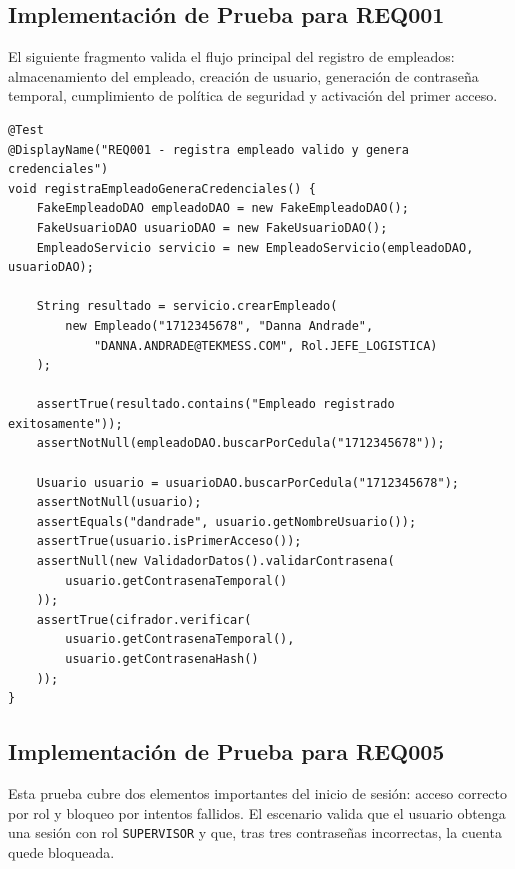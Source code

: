 \documentclass[12pt,a4paper]{article}
\begin{document}
\subsection{Implementación de Prueba para REQ001}

El siguiente fragmento valida el flujo principal del registro de empleados: almacenamiento del empleado, creación de usuario, generación de contraseña temporal, cumplimiento de política de seguridad y activación del primer acceso.

\begin{lstlisting}[style=javaStyle, caption={Prueba de registro de empleado y generación de credenciales}]
@Test
@DisplayName("REQ001 - registra empleado valido y genera credenciales")
void registraEmpleadoGeneraCredenciales() {
    FakeEmpleadoDAO empleadoDAO = new FakeEmpleadoDAO();
    FakeUsuarioDAO usuarioDAO = new FakeUsuarioDAO();
    EmpleadoServicio servicio = new EmpleadoServicio(empleadoDAO, usuarioDAO);

    String resultado = servicio.crearEmpleado(
        new Empleado("1712345678", "Danna Andrade",
            "DANNA.ANDRADE@TEKMESS.COM", Rol.JEFE_LOGISTICA)
    );

    assertTrue(resultado.contains("Empleado registrado exitosamente"));
    assertNotNull(empleadoDAO.buscarPorCedula("1712345678"));

    Usuario usuario = usuarioDAO.buscarPorCedula("1712345678");
    assertNotNull(usuario);
    assertEquals("dandrade", usuario.getNombreUsuario());
    assertTrue(usuario.isPrimerAcceso());
    assertNull(new ValidadorDatos().validarContrasena(
        usuario.getContrasenaTemporal()
    ));
    assertTrue(cifrador.verificar(
        usuario.getContrasenaTemporal(),
        usuario.getContrasenaHash()
    ));
}
\end{lstlisting}

\subsection{Implementación de Prueba para REQ005}

Esta prueba cubre dos elementos importantes del inicio de sesión: acceso correcto por rol y bloqueo por intentos fallidos. El escenario valida que el usuario obtenga una sesión con rol \texttt{SUPERVISOR} y que, tras tres contraseñas incorrectas, la cuenta quede bloqueada.
\end{document}
